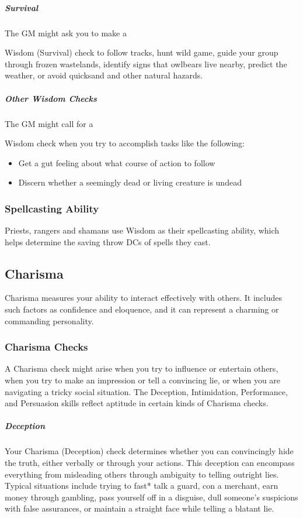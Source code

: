 \subparagraph*{Survival} The GM might ask you to make a

Wisdom (Survival) check to follow tracks, hunt wild game, guide your group through frozen wastelands, identify signs that owlbears live nearby, predict the weather, or avoid quicksand and other natural hazards.

\subparagraph*{Other Wisdom Checks} The GM might call for a

Wisdom check when you try to accomplish tasks like the following:

\begin{itemize}
    \item Get a gut feeling about what course of action to follow
    \item Discern whether a seemingly dead or living creature is undead
\end{itemize}

\subsubsection{Spellcasting Ability}

Priests, rangers and shamans use Wisdom as their spellcasting ability, which helps determine the saving throw DCs of spells they cast.

\subsection{Charisma}

Charisma measures your ability to interact effectively with others. It includes such factors as confidence and eloquence, and it can represent a charming or commanding personality.

\subsubsection{Charisma Checks}

A Charisma check might arise when you try to influence or entertain others, when you try to make an impression or tell a convincing lie, or when you are navigating a tricky social situation. The Deception, Intimidation, Performance, and Persuasion skills reflect aptitude in certain kinds of Charisma checks.

\subparagraph*{Deception} Your Charisma (Deception) check determines whether you can convincingly hide the truth, either verbally or through your actions. This deception can encompass everything from misleading others through ambiguity to telling outright lies. Typical situations include trying to fast* talk a guard, con a merchant, earn money through gambling, pass yourself off in a disguise, dull someone's suspicions with false assurances, or maintain a straight face while telling a blatant lie.

